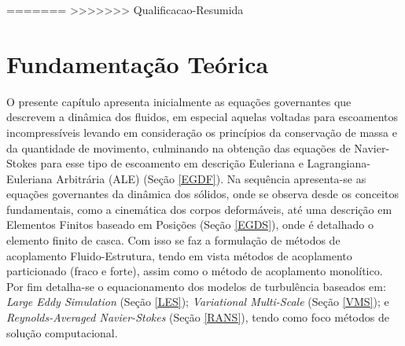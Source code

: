 \documentclass[_ArquivoPrincipal.tex]{subfiles}
\begin{document}
=======
>>>>>>> Qualificacao-Resumida
\chapter{Fundamentação Teórica} \label{FT}

O presente capítulo apresenta inicialmente as equações governantes que descrevem a dinâmica dos fluidos, em especial aquelas voltadas para escoamentos incompressíveis levando em consideração os princípios da conservação de massa e da quantidade de movimento, culminando na obtenção das equações de Navier-Stokes para esse tipo de escoamento em descrição Euleriana e Lagrangiana-Euleriana Arbitrária (ALE) (Seção \ref{EGDF}). Na sequência apresenta-se as equações governantes da dinâmica dos sólidos, onde se observa desde os conceitos fundamentais, como a cinemática dos corpos deformáveis, até uma descrição em Elementos Finitos baseado em Posições (Seção \ref{EGDS}), onde é detalhado o elemento finito de casca. Com isso se faz a formulação de métodos de acoplamento Fluido-Estrutura, tendo em vista métodos de acoplamento particionado (fraco e forte), assim como o método de acoplamento monolítico. Por fim detalha-se o equacionamento dos modelos de turbulência baseados em: \textit{Large Eddy Simulation} (Seção \ref{LES}); \textit{Variational Multi-Scale} (Seção \ref{VMS}); e \textit{Reynolds-Averaged Navier-Stokes} (Seção \ref{RANS}), tendo como foco métodos de solução computacional.

%




\end{document}
